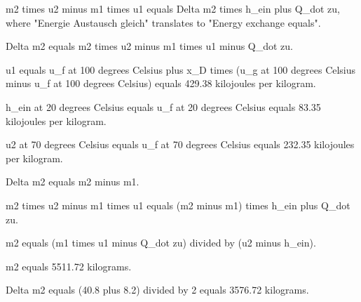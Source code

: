 m2 times u2 minus m1 times u1 equals Delta m2 times h_ein plus Q_dot zu, where "Energie Austausch gleich" translates to "Energy exchange equals".

Delta m2 equals m2 times u2 minus m1 times u1 minus Q_dot zu.

u1 equals u_f at 100 degrees Celsius plus x_D times (u_g at 100 degrees Celsius minus u_f at 100 degrees Celsius) equals 429.38 kilojoules per kilogram.

h_ein at 20 degrees Celsius equals u_f at 20 degrees Celsius equals 83.35 kilojoules per kilogram.

u2 at 70 degrees Celsius equals u_f at 70 degrees Celsius equals 232.35 kilojoules per kilogram.

Delta m2 equals m2 minus m1.

m2 times u2 minus m1 times u1 equals (m2 minus m1) times h_ein plus Q_dot zu.

m2 equals (m1 times u1 minus Q_dot zu) divided by (u2 minus h_ein).

m2 equals 5511.72 kilograms.

Delta m2 equals (40.8 plus 8.2) divided by 2 equals 3576.72 kilograms.